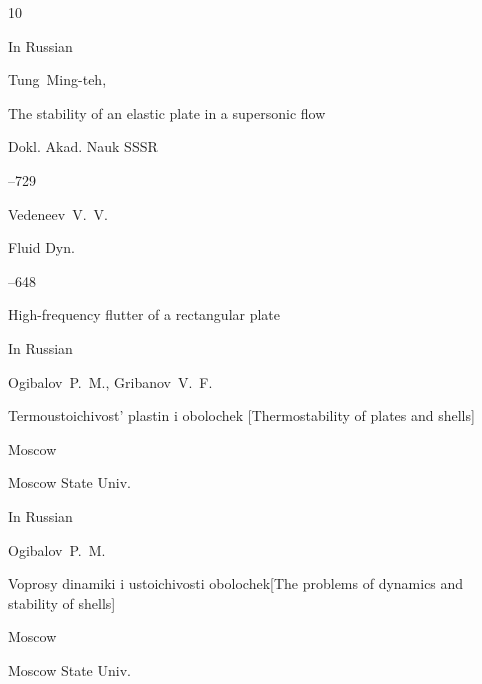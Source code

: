 \begin{thebibliography}{10}

\lang In Russian

\by Tung~Ming-teh,

\paper The stability of an elastic plate in a supersonic flow

\jour Dokl. Akad. Nauk SSSR




--729




\by Vedeneev~V.~V.

\jour Fluid Dyn.





–648 

\paper High-frequency flutter of a rectangular plate










\lang In Russian

\by Ogibalov~P.~M., Gribanov~V.~F. 

\book Termoustoichivost' plastin i obolochek \rm  [Thermostability of plates and shells]


\publaddr Moscow

\publ Moscow State Univ.









\lang In Russian

\by Ogibalov~P.~M.

\book Voprosy dinamiki i ustoichivosti obolochek\rm  [The problems of dynamics and stability of shells]

\publaddr Moscow

\publ Moscow State Univ.










\end{thebibliography}
